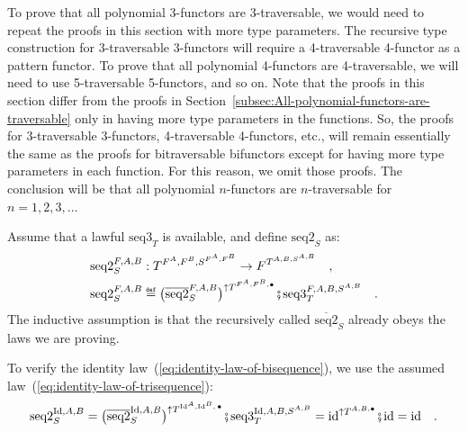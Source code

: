 To prove that all polynomial 3-functors are 3-traversable, we would
need to repeat the proofs in this section with more type parameters.
The recursive type construction for 3-traversable 3-functors will
require a 4-traversable 4-functor as a pattern functor. To prove that
all polynomial 4-functors are 4-traversable, we will need to use 5-traversable
5-functors, and so on. Note that the proofs in this section differ
from the proofs in Section~\ref{subsec:All-polynomial-functors-are-traversable}
only in having more type parameters in the functions. So, the proofs
for 3-traversable 3-functors, 4-traversable 4-functors, etc., will
remain essentially the same as the proofs for bitraversable bifunctors
except for having more type parameters in each function. For this
reason, we omit those proofs. The conclusion will be that all polynomial
$n$-functors are $n$-traversable for $n=1,2,3,...$

Assume that a lawful $\text{seq3}_{T}$ is available, and define $\text{seq2}_{S}$
as:
\begin{align*}
 & \text{seq2}_{S}^{F,A,B}:T^{F^{A},F^{B},S^{F^{A},F^{B}}}\rightarrow F^{T^{A,B,S^{A,B}}}\quad,\\
 & \text{seq2}_{S}^{F,A,B}\triangleq\big(\overline{\text{seq2}}_{S}^{F,A,B}\big)^{\uparrow T^{F^{A},F^{B},\bullet}}\bef\text{seq3}_{T}^{F,A,B,S^{A,B}}\quad.
\end{align*}
The inductive assumption is that the recursively called $\overline{\text{seq2}}_{S}$
already obeys the laws we are proving.

To verify the identity law~(\ref{eq:identity-law-of-bisequence}),
we use the assumed law~(\ref{eq:identity-law-of-trisequence}):
\[
\text{seq2}_{S}^{\text{Id},A,B}=\big(\overline{\text{seq2}}_{S}^{\text{Id},A,B}\big)^{\uparrow T^{\text{Id}^{A},\text{Id}^{B},\,\bullet}}\bef\text{seq3}_{T}^{\text{Id},A,B,S^{A,B}}=\text{id}^{\uparrow T^{A,B,\bullet}}\bef\text{id}=\text{id}\quad.
\]

